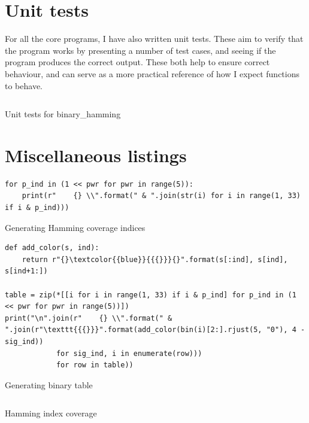 \documentclass[11pt]{article}
\newenvironment{longlisting}
{\addvspace{\baselineskip}\captionsetup{type=listing}}
{\addvspace{\baselineskip}}
\begin{document}
    \section{Unit tests}

    For all the core programs, I have also written unit tests. These aim to
    verify that the program works by presenting a number of test cases, and
    seeing if the program produces the correct output. These both help to ensure
    correct behaviour, and can serve as a more practical reference of how I
    expect functions to behave.

\begin{longlisting}
\inputminted{python}{../src/test_binary_hamming.py}
\caption{Unit tests for binary\_hamming}
\end{longlisting}

    \section{Miscellaneous listings}

\begin{longlisting}
\begin{verbatim}
for p_ind in (1 << pwr for pwr in range(5)):
    print(r"    {} \\".format(" & ".join(str(i) for i in range(1, 33) if i & p_ind)))
\end{verbatim}
\caption{Generating Hamming coverage indices}\label{lst:hamtab}
\end{longlisting}

\begin{longlisting}
\begin{verbatim}
def add_color(s, ind):
    return r"{}\textcolor{{blue}}{{{}}}{}".format(s[:ind], s[ind], s[ind+1:])

table = zip(*[[i for i in range(1, 33) if i & p_ind] for p_ind in (1 << pwr for pwr in range(5))])
print("\n".join(r"    {} \\".format(" & ".join(r"\texttt{{{}}}".format(add_color(bin(i)[2:].rjust(5, "0"), 4 -sig_ind))
            for sig_ind, i in enumerate(row)))
            for row in table))
\end{verbatim}
\caption{Generating binary table}\label{lst:hamcol}
\end{longlisting}

\begin{longlisting}
\inputminted{postscript}{../psfiles/hamming_visualisation.ps}
\caption{Hamming index coverage}\label{lst:hamps}
\end{longlisting}
\end{document}
